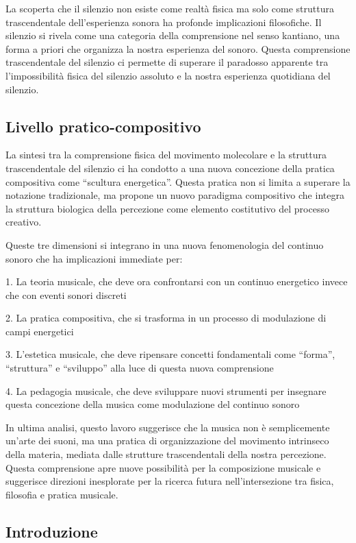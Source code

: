 \documentclass[a4paper,11pt]{article}
\begin{document}
La scoperta che il silenzio non esiste come realtà fisica ma solo come
struttura trascendentale dell'esperienza sonora ha profonde implicazioni
filosofiche. Il silenzio si rivela come una categoria della comprensione
nel senso kantiano, una forma a priori che organizza la nostra
esperienza del sonoro. Questa comprensione trascendentale del silenzio
ci permette di superare il paradosso apparente tra l'impossibilità
fisica del silenzio assoluto e la nostra esperienza quotidiana del
silenzio.

\subsection{Livello
pratico-compositivo}\label{livello-pratico-compositivo}

La sintesi tra la comprensione fisica del movimento molecolare e la
struttura trascendentale del silenzio ci ha condotto a una nuova
concezione della pratica compositiva come ``scultura energetica''.
Questa pratica non si limita a superare la notazione tradizionale, ma
propone un nuovo paradigma compositivo che integra la struttura
biologica della percezione come elemento costitutivo del processo
creativo.

Queste tre dimensioni si integrano in una nuova fenomenologia del
continuo sonoro che ha implicazioni immediate per:

1. La teoria musicale, che deve ora confrontarsi con un continuo
energetico invece che con eventi sonori discreti

2. La pratica compositiva, che si trasforma in un processo di
modulazione di campi energetici

3. L'estetica musicale, che deve ripensare concetti fondamentali come
``forma'', ``struttura'' e ``sviluppo'' alla luce di questa nuova
comprensione

4. La pedagogia musicale, che deve sviluppare nuovi strumenti per
insegnare questa concezione della musica come modulazione del continuo
sonoro

In ultima analisi, questo lavoro suggerisce che la musica non è
semplicemente un'arte dei suoni, ma una pratica di organizzazione del
movimento intrinseco della materia, mediata dalle strutture
trascendentali della nostra percezione. Questa comprensione apre nuove
possibilità per la composizione musicale e suggerisce direzioni
inesplorate per la ricerca futura nell'intersezione tra fisica,
filosofia e pratica musicale.

\subsection{Introduzione}\label{introduzione}
\end{document}

